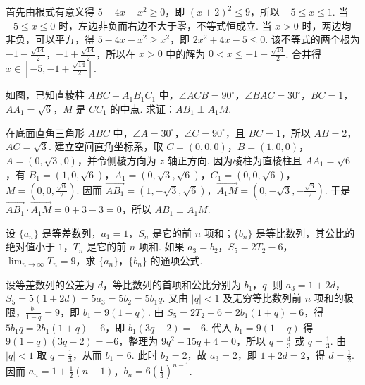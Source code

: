 \begin{solution}
首先由根式有意义得 \(5-4x-x^2\geqslant0\)，即 \((x+2)^2\leqslant9\)，所以 \(-5\leqslant x\leqslant1\). 当 \(-5\leqslant x\leqslant0\) 时，左边非负而右边不大于零，不等式恒成立. 当 \(x>0\) 时，两边均非负，可以平方，得 \(5-4x-x^2\geqslant x^2\)，即 \(2x^2+4x-5\leqslant0\). 该不等式的两个根为 \(-1-\frac{\sqrt{14}}{2}\)，\(-1+\frac{\sqrt{14}}{2}\)，所以在 \(x>0\) 中的解为 \(0<x\leqslant-1+\frac{\sqrt{14}}{2}\). 合并得 \(x\in\left[-5,-1+\frac{\sqrt{14}}{2}\right]\).
\end{solution}

\begin{problem}
如图，已知直棱柱 \(ABC-A_1B_1C_1\) 中，\(\angle ACB=90^{\circ}\)，\(\angle BAC=30^{\circ}\)，\(BC=1\)，\(AA_1=\sqrt{6}\)，\(M\) 是 \(CC_1\) 的中点. 求证：\(AB_1\perp A_1M\).

\end{problem}

\begin{solution}
在底面直角三角形 \(ABC\) 中，\(\angle A=30^{\circ}\)，\(\angle C=90^{\circ}\)，且 \(BC=1\)，所以 \(AB=2\)，\(AC=\sqrt{3}\). 建立空间直角坐标系，取 \(C=(0,0,0)\)，\(B=(1,0,0)\)，\(A=(0,\sqrt{3},0)\)，并令侧棱方向为 \(z\) 轴正方向. 因为棱柱为直棱柱且 \(AA_1=\sqrt{6}\)，有 \(B_1=(1,0,\sqrt{6})\)，\(A_1=(0,\sqrt{3},\sqrt{6})\)，\(C_1=(0,0,\sqrt{6})\)，\(M=\left(0,0,\frac{\sqrt{6}}{2}\right)\). 因而
\(\overrightarrow{AB_1}=(1,-\sqrt{3},\sqrt{6})\)，\(\overrightarrow{A_1M}=\left(0,-\sqrt{3},-\frac{\sqrt{6}}{2}\right)\). 于是 \(\overrightarrow{AB_1}\cdot\overrightarrow{A_1M}=0+3-3=0\)，所以 \(AB_1\perp A_1M\).
\end{solution}

\begin{problem}
设 \(\{a_n\}\) 是等差数列，\(a_1=1\)，\(S_n\) 是它的前 \(n\) 项和；\(\{b_n\}\) 是等比数列，其公比的绝对值小于 \(1\)，\(T_n\) 是它的前 \(n\) 项和. 如果 \(a_3=b_2\)，\(S_5=2T_2-6\)，\(\displaystyle\lim_{n\to\infty} T_n=9\)，求 \(\{a_n\}\)，\(\{b_n\}\) 的通项公式.
\end{problem}

\begin{solution}
设等差数列的公差为 \(d\)，等比数列的首项和公比分别为 \(b_1\)，\(q\). 则 \(a_3=1+2d\)，\(S_5=5(1+2d)=5a_3=5b_2=5b_1q\). 又由 \(\left|q\right|<1\) 及无穷等比数列前 \(n\) 项和的极限，\(\frac{b_1}{1-q}=9\)，即 \(b_1=9(1-q)\). 由 \(S_5=2T_2-6=2b_1(1+q)-6\)，得 \(5b_1q=2b_1(1+q)-6\)，即 \(b_1(3q-2)=-6\). 代入 \(b_1=9(1-q)\) 得 \(9(1-q)(3q-2)=-6\)，整理为 \(9q^2-15q+4=0\)，所以 \(q=\frac{4}{3}\) 或 \(q=\frac{1}{3}\). 由 \(\left|q\right|<1\) 取 \(q=\frac{1}{3}\)，从而 \(b_1=6\). 此时 \(b_2=2\)，故 \(a_3=2\)，即 \(1+2d=2\)，得 \(d=\frac{1}{2}\). 因而 \(a_n=1+\frac{1}{2}(n-1)\)，\(b_n=6\left(\frac{1}{3}\right)^{n-1}\).
\end{solution}

